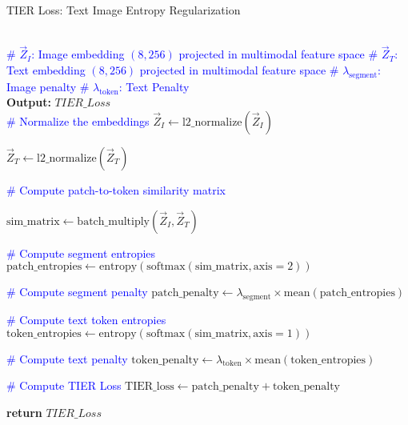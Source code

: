 \begin{algorithm}
    \caption{TIER Loss: Text Image Entropy Regularization}
    \label{algo:entropyloss}
    \begin{algorithmic}[1]
            \\
            \State \textcolor{blue}{\# $\vec{Z}_{I}$: Image embedding $(8, 256)$ projected in multimodal feature space}
            \State \textcolor{blue}{\# $\vec{Z}_{T}$: Text embedding $(8, 256)$ projected in multimodal feature space}
            \State \textcolor{blue}{\# $\lambda_{\text{segment}}$: Image penalty}
            \State \textcolor{blue}{\# $\lambda_{\text{token}}$: Text Penalty}
            \\            
            \State \textbf{Output:} $TIER\_Loss$ 
            \\

            \State
            \textcolor{blue}{\# Normalize the embeddings } 
            \State $\vec{Z}_{I} \gets \text{l2\_normalize}(\vec{Z}_{I})$
            
            \State $\vec{Z}_{T} \gets \text{l2\_normalize}(\vec{Z}_{T})$
            
            \State
            \textcolor{blue}{\# Compute patch-to-token similarity matrix }
    
            \State $\text{sim\_matrix} \gets \text{batch\_multiply}(\vec{Z}_{I}, \vec{Z}_{T})$
            
            \State\textcolor{blue}{\# Compute segment entropies}
            \State $\text{patch\_entropies} \gets \text{entropy}(\text{softmax}(\text{sim\_matrix}, \text{axis}=2))$
    
            \State
            \textcolor{blue}{\# Compute segment penalty}
            \State $\text{patch\_penalty} \gets \lambda_{\text{segment}} \times \text{mean}(\text{patch\_entropies})$ %
    
            \State
            \textcolor{blue}{\# Compute text token entropies}        
            \State $\text{token\_entropies} \gets \text{entropy}(\text{softmax}(\text{sim\_matrix}, \text{axis}=1))$ %
    
            \State
            
            \State
            \textcolor{blue}{\# Compute text penalty}
            \State $\text{token\_penalty} \gets \lambda_{\text{token}} \times \text{mean}(\text{token\_entropies})$ %
    
            \State
    
            \State
            \textcolor{blue}{\# Compute TIER Loss}
            \State $\text{TIER\_loss} \gets \text{patch\_penalty} + \text{token\_penalty}$ %
                
    
            \State \textbf{return} $TIER\_Loss$
        \EndProcedure
    \end{algorithmic}
\end{algorithm}
